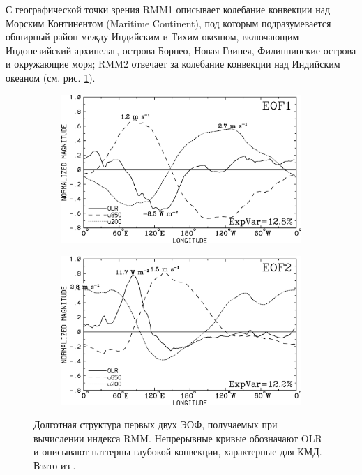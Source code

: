 С географической точки зрения RMM1 описывает колебание конвекции над Морским Континентом (Maritime Continent), под которым подразумевается обширный район между Индийским и Тихим океаном, включающим Индонезийский архипелаг, острова Борнео, Новая Гвинея, Филиппинские острова и окружающие моря; RMM2 отвечает за колебание конвекции над Индийским океаном (см. рис. \ref{fig:wh04_fig1}).
\begin{figure}  
    \centering
    \begin{subfigure}[t]{.49\textwidth}
		\centering
		\includegraphics[width=\textwidth]{figures/wh04_fig1_eof1.png}
    \end{subfigure}
    \hfill
    \begin{subfigure}[t]{.49\textwidth}
		\centering
		\includegraphics[width=\textwidth]{figures/wh04_fig1_eof2.png}
    \end{subfigure}
    \caption{Долготная структура первых двух ЭОФ, получаемых при вычислении индекса RMM. Непрерывные кривые обозначают OLR и описывают паттерны глубокой конвекции, характерные для КМД. Взято из \cite[рис. 1]{Wheeler_Hendon_2004}.}
	\label{fig:wh04_fig1}
\end{figure}

